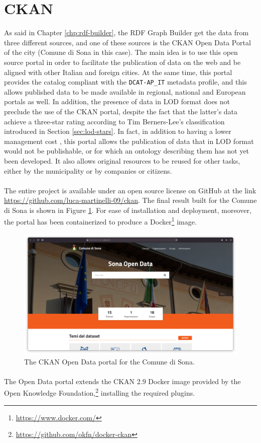 \section{CKAN}
\label{sec:ckan-webapp}

As said in Chapter \ref{chp:rdf-builder}, the \ac{RDF} Graph Builder get the data from three different sources, and one of these sources is the CKAN Open Data Portal of the city (Comune di Sona in this case). The main idea is to use this open source portal in order to facilitate the publication of data on the web and be aligned with other Italian and foreign cities. At the same time, this portal provides the catalog  compliant with the \verb#DCAT-AP_IT# metadata profile, and this allows published data to be made available in regional, national and European portals as well. In addition, the presence of data in \acl{LOD} format does not preclude the use of the CKAN portal, despite the fact that the latter's data achieve a three-star rating according to Tim Berners-Lee's classification introduced in Section \ref{sec:lod-stars}. In fact, in addition to having a lower management cost \cite{bauer2011linked}, this portal allows the publication of data that in \acl{LOD} format would not be publishable, or for which an ontology describing them has not yet been developed. It also allows original resources to be reused for other tasks, either by the municipality or by companies or citizens.

\paragraph*{}
The entire project is available under an open source license on GitHub at the link \url{https://github.com/luca-martinelli-09/ckan}. The final result built for the Comune di Sona is shown in Figure \ref{fig:ckan-sona}. For ease of installation and deployment, moreover, the portal has been containerized to produce a Docker\footnote{\url{https://www.docker.com/}} image.

\begin{figure}[!ht]
  \centering
  \includegraphics[width=\columnwidth]{images/ckan/ckan-sona}
  \caption{The CKAN Open Data portal for the Comune di Sona.}
  \label{fig:ckan-sona}
\end{figure}

\paragraph*{}
The Open Data portal extends the CKAN 2.9 Docker image provided by the Open Knowledge Foundation,\footnote{\url{https://github.com/okfn/docker-ckan}} installing the required plugins.